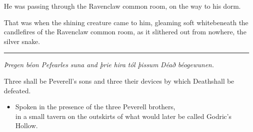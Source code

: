 He was passing through the Ravenclaw common room, on the way to his dorm.

That was when the shining creature came to him, gleaming soft whitebeneath the candlefires of the Ravenclaw common room, as it slithered out from nowhere, the silver snake.

\begin{center}\rule{3in}{0.4pt}\end{center}

\emph{Þregen béon Pefearles suna and þrie hira tól þissum Déað béogewunen.}

Three shall be Peverell's sons and three their devices by which Deathshall be defeated.

\begin{itemize}\itemsep1pt\parskip0pt\item  Spoken in the presence of the three Peverell brothers,\\ in a small tavern on the outskirts of what would later be called Godric's Hollow.\end{itemize}